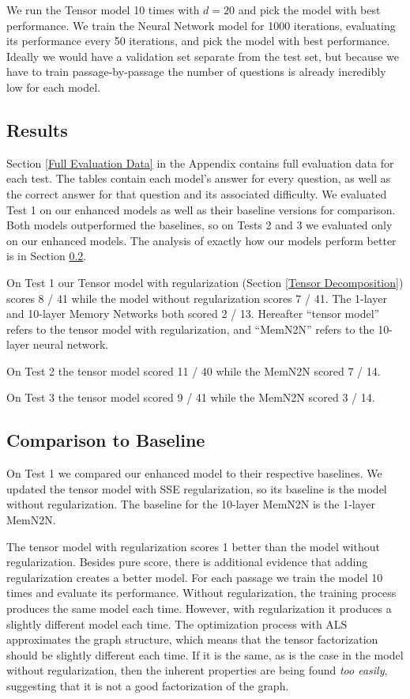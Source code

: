 \documentclass[pageno]{final_paper}
\begin{document}
We run the Tensor model 10 times with $d=20$ and pick the model with best
performance. We train the Neural Network model for 1000 iterations, evaluating
its performance every 50 iterations, and pick the model with best performance.
Ideally we would have a validation set separate from the test set, but because
we have to train passage-by-passage the number of questions is already
incredibly low for each model.

\subsection{Results}
\label{Results}

Section \ref{Full Evaluation Data} in the Appendix contains full evaluation data
for each test. The tables contain each model's answer for every question, as
well as the correct answer for that question and its associated difficulty. We
evaluated Test 1 on our enhanced models as well as their baseline versions for
comparison. Both models outperformed the baselines, so on Tests 2 and 3 we
evaluated only on our enhanced models. The analysis of exactly how our models
perform better is in Section \ref{Comparison to Baseline}.

On Test 1 our Tensor model with regularization (Section \ref{Tensor
Decomposition}) scores 8 / 41 while the model without regularization scores 7 /
41. The 1-layer and 10-layer Memory Networks both scored 2 / 13. Hereafter
``tensor model'' refers to the tensor model with regularization, and ``MemN2N''
refers to the 10-layer neural network.

On Test 2 the tensor model scored 11 / 40 while the MemN2N scored 7 / 14.

On Test 3 the tensor model scored 9 / 41 while the MemN2N scored 3 / 14.

\subsection{Comparison to Baseline}
\label{Comparison to Baseline}

On Test 1 we compared our enhanced model to their respective baselines. We
updated the tensor model with SSE regularization, so its baseline is the model
without regularization. The baseline for the 10-layer MemN2N is the 1-layer
MemN2N.

The tensor model with regularization scores 1 better than the model without
regularization. Besides pure score, there is additional evidence that adding
regularization creates a better model. For each passage we train the model 10
times and evaluate its performance. Without regularization, the training process
produces the same model each time. However, with regularization it produces a
slightly different model each time. The optimization process with ALS
approximates the graph structure, which means that the tensor factorization
should be slightly different each time. If it is the same, as is the case in the
model without regularization, then the inherent properties are being found
\textit{too easily}, suggesting that it is not a good factorization of the
graph.
\end{document}
